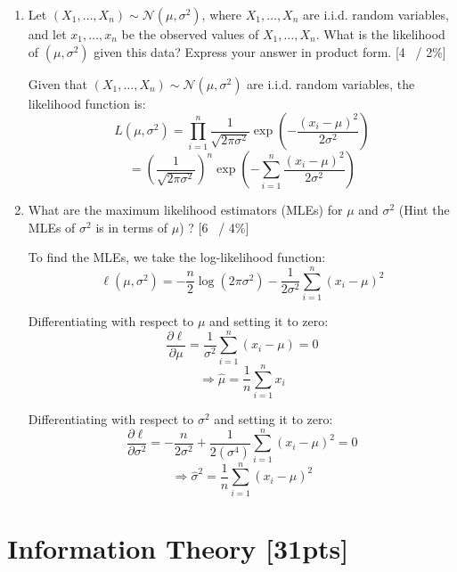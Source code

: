 \documentclass{article}
\begin{document}
\begin{enumerate}[label=(\alph*)]

   \item  Let \((X_1, \ldots, X_n) \sim \mathcal{N}(\mu, \sigma^2)\), where \(X_1, \ldots, X_n\) are i.i.d. random variables, and let \(x_1, \ldots, x_n\) be the observed values of \(X_1, \ldots, X_n\). What is the likelihood of \((\mu, \sigma^2)\) given this data? Express your answer in product form. [4~ / 2\%]

   Given that $(X_1, \ldots, X_n) \sim \mathcal{N}(\mu, \sigma^2)$ are i.i.d. random variables, the likelihood function is:
\[
    L(\mu, \sigma^2) = \prod_{i=1}^{n} \frac{1}{\sqrt{2\pi \sigma^2}} \exp\left(-\frac{(x_i - \mu)^2}{2\sigma^2}\right)
\]
\[
    = \left(\frac{1}{\sqrt{2\pi \sigma^2}}\right)^n \exp\left(-\sum_{i=1}^{n} \frac{(x_i - \mu)^2}{2\sigma^2}\right)
\]
   
   \item What are the maximum likelihood estimators (MLEs) for \(\mu\) and \(\sigma^2\) (Hint the MLEs of  \(\sigma^2\) is in terms of \(\mu\)) ? [6~ / 4\%] 

   To find the MLEs, we take the log-likelihood function:
\[
    \ell(\mu, \sigma^2) = -\frac{n}{2} \log(2\pi \sigma^2) - \frac{1}{2\sigma^2} \sum_{i=1}^{n} (x_i - \mu)^2
\]

Differentiating with respect to $\mu$ and setting it to zero:
\[
    \frac{\partial \ell}{\partial \mu} = \frac{1}{\sigma^2} \sum_{i=1}^{n} (x_i - \mu) = 0
\]
\[
    \Rightarrow \hat{\mu} = \frac{1}{n} \sum_{i=1}^{n} x_i
\]

Differentiating with respect to $\sigma^2$ and setting it to zero:
\[
    \frac{\partial \ell}{\partial \sigma^2} = -\frac{n}{2\sigma^2} + \frac{1}{2(\sigma^4)} \sum_{i=1}^{n} (x_i - \mu)^2 = 0
\]
\[
    \Rightarrow \hat{\sigma}^2 = \frac{1}{n} \sum_{i=1}^{n} (x_i - \hat{\mu})^2
\]

\end{enumerate}

\newpage

\section{Information Theory [31pts]}
\end{document}
